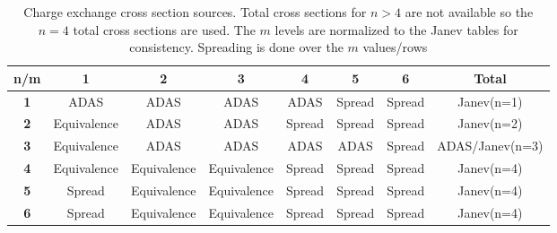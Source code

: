 \begin{table}[ht]
\centering
\caption{Charge exchange cross section sources. Total cross sections for $n>4$ are not available so the $n=4$ total cross sections are used. The $m$ levels are normalized to the Janev\cite{janev2003collision} tables for consistency. Spreading is done over the $m$ values/rows}
\label{tab:cx_sources}
\begin{tabular}{c|c|c|c|c|c|c|c}
\textbf{n/m}        & \textbf{1}                          & \textbf{2}                          & \textbf{3}                          & \textbf{4}                    & \textbf{5}                    & \textbf{6}                    & \textbf{Total}  \\ \hline
\textbf{1} & {\color[HTML]{CB0000} ADAS}         & {\color[HTML]{CB0000} ADAS}         & {\color[HTML]{CB0000} ADAS}         & {\color[HTML]{CB0000} ADAS}   & {\color[HTML]{00009B} Spread} & {\color[HTML]{00009B} Spread} & Janev(n=1)      \\ \hline
\textbf{2} & {\color[HTML]{036400} Equivalence}  & {\color[HTML]{CB0000} ADAS}         & {\color[HTML]{CB0000} ADAS}         & {\color[HTML]{00009B} Spread} & {\color[HTML]{00009B} Spread} & {\color[HTML]{00009B} Spread} & Janev(n=2)      \\ \hline
\textbf{3} & {\color[HTML]{036400} Equivalence} & {\color[HTML]{CB0000} ADAS}         & {\color[HTML]{CB0000} ADAS}         & {\color[HTML]{CB0000} ADAS}   & {\color[HTML]{CB0000} ADAS}   & {\color[HTML]{00009B} Spread} & ADAS/Janev(n=3) \\ \hline
\textbf{4} & {\color[HTML]{036400} Equivalence} & {\color[HTML]{036400} Equivalence} & {\color[HTML]{036400} Equivalence} & {\color[HTML]{00009B} Spread} & {\color[HTML]{00009B} Spread} & {\color[HTML]{00009B} Spread} & Janev(n=4)      \\ \hline
\textbf{5} & {\color[HTML]{00009B} Spread}       & {\color[HTML]{036400} Equivalence} & {\color[HTML]{036400} Equivalence} & {\color[HTML]{00009B} Spread} & {\color[HTML]{00009B} Spread} & {\color[HTML]{00009B} Spread} & Janev(n=4)      \\ \hline
\textbf{6} & {\color[HTML]{00009B} Spread}       & {\color[HTML]{036400} Equivalence} & {\color[HTML]{036400} Equivalence} & {\color[HTML]{00009B} Spread} & {\color[HTML]{00009B} Spread} & {\color[HTML]{00009B} Spread} & Janev(n=4)     
\end{tabular}
\end{table}

